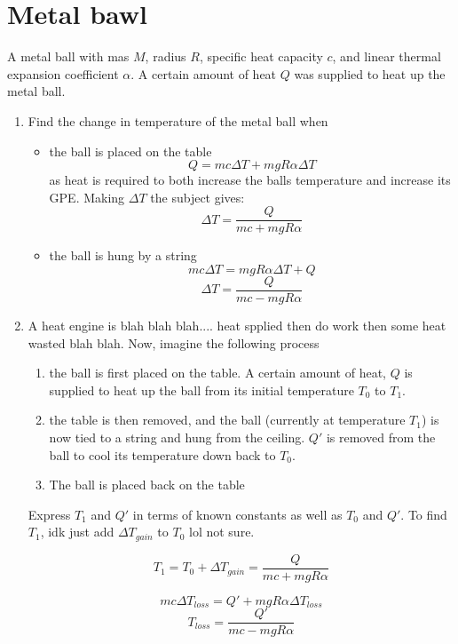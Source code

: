 \documentclass{scrartcl}
\begin{document}
\section{Metal bawl}
A metal ball with mas $M$, radius $R$, specific heat capacity $c$, and linear thermal expansion coefficient $\alpha$. A certain amount of heat $Q$ was supplied to heat up the metal ball.
\begin{enumerate}
      \item Find the change in temperature of the metal ball when
            \begin{itemize}
                  \item the ball is placed on the table
                        $$Q=mc\Delta T + mgR\alpha\Delta T$$
                        as heat is required to both increase the balls temperature and increase its GPE.
                        Making $\Delta T$ the subject gives:
                        $$\Delta T=\frac{Q}{mc+mgR\alpha}$$
                  \item the ball is hung by a string
                        $$mc\Delta T= mgR\alpha\Delta T+Q$$
                        $$\Delta T = \frac{Q}{mc-mgR\alpha}$$
            \end{itemize}
      \item A heat engine is blah blah blah.... heat spplied then do work then some heat wasted blah blah. Now, imagine the following process
            \begin{enumerate}
                  \item the ball is first placed on the table. A certain amount of heat, $Q$ is supplied to heat up the ball from its initial temperature $T_0$ to $T_1$.
                  \item the table is then removed, and the ball (currently at temperature $T_1$) is now tied to a string and hung from the ceiling. $Q'$ is removed from the ball to cool its temperature down back to $T_0$.
                  \item The ball is placed back on the table
            \end{enumerate}
            Express $T_1$ and $Q'$ in terms of known constants as well as $T_0$ and $Q'$.
            To find $T_1$, idk just add $\Delta T_{gain}$ to $T_0$ lol not sure.

            $$T_1=T_0+\Delta T_{gain}=\frac{Q}{mc+mgR\alpha}$$

            $$mc\Delta T_{loss} =Q'+mgR\alpha\Delta T_{loss}$$
            $$T_{loss}=\frac{Q'}{mc-mgR\alpha}$$


\end{enumerate}
\end{document}
